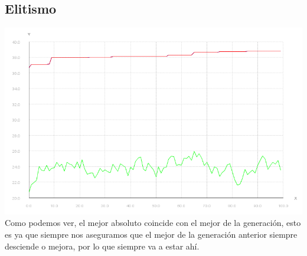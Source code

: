 \documentclass{article}
\begin{document}
\subsection{Elitismo}
\includegraphics[scale=0.5]{./images/graph1_eli.png}
Como podemos ver, el mejor absoluto coincide con el mejor de la generación, esto es ya que siempre nos aseguramos que el mejor de la generación anterior siempre desciende o mejora, por lo que siempre va a estar ahí.
\end{document}

